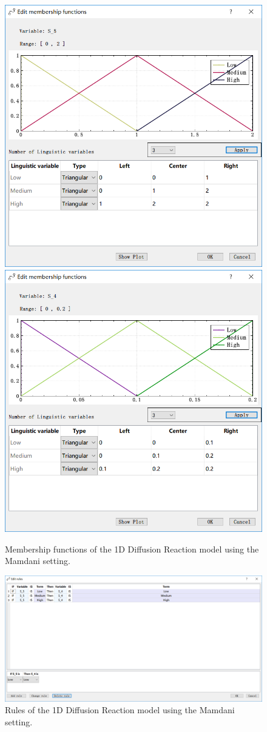 \documentclass[journal,a4paper,onecolumn]{article}
\begin{document}
\begin{figure}[!hbt]
	\begin{center}
		\includegraphics[width=0.45\columnwidth]{fig31}
		\includegraphics[width=0.45\columnwidth]{fig32}
		\caption{Membership functions of the 1D Diffusion Reaction model using the Mamdani setting.}
		\label{fig:Membership functions of 1D Diffusion Reaction using Mamdani.}
	\end{center}
\end{figure}

\begin{figure}[!hbt]
	\begin{center}
		\includegraphics[width=\columnwidth]{fig33}
		\caption{Rules of the 1D Diffusion Reaction model using the Mamdani setting.}
		\label{fig:Rules of 1D Diffusion Reaction using Mamdani.}
	\end{center}
\end{figure}
\end{document}
